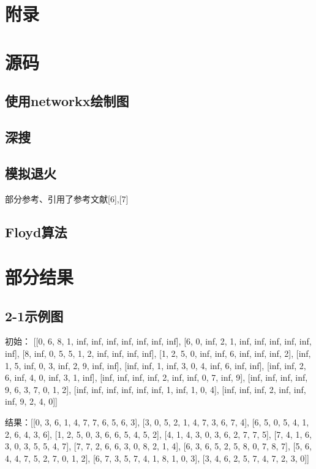 \documentclass[12pt]{article}
\begin{document}
\section*{附录}
\setcounter{footnote}{0}
\setcounter{section}{0}
\section{源码}
\subsection{使用networkx绘制图}

\subsection{深搜}

\subsection{模拟退火}
部分参考、引用了参考文献[6],[7]

\subsection{Floyd算法}

\section{部分结果}
\subsection{2-1示例图}
初始： [[0, 6, 8, 1, inf, inf, inf, inf, inf, inf, inf],
 [6, 0, inf, 2, 1, inf, inf, inf, inf, inf, inf],
 [8, inf, 0, 5, 5, 1, 2, inf, inf, inf, inf],
 [1, 2, 5, 0, inf, inf, 6, inf, inf, inf, 2],
 [inf, 1, 5, inf, 0, 3, inf, 2, 9, inf, inf],
 [inf, inf, 1, inf, 3, 0, 4, inf, 6, inf, inf],
 [inf, inf, 2, 6, inf, 4, 0, inf, 3, 1, inf],
 [inf, inf, inf, inf, 2, inf, inf, 0, 7, inf, 9],
 [inf, inf, inf, inf, 9, 6, 3, 7, 0, 1, 2],
 [inf, inf, inf, inf, inf, inf, 1, inf, 1, 0, 4],
 [inf, inf, inf, 2, inf, inf, inf, 9, 2, 4, 0]]
 
 
 结果：[[0, 3, 6, 1, 4, 7, 7, 6, 5, 6, 3],
 [3, 0, 5, 2, 1, 4, 7, 3, 6, 7, 4],
 [6, 5, 0, 5, 4, 1, 2, 6, 4, 3, 6],
 [1, 2, 5, 0, 3, 6, 6, 5, 4, 5, 2],
 [4, 1, 4, 3, 0, 3, 6, 2, 7, 7, 5],
 [7, 4, 1, 6, 3, 0, 3, 5, 5, 4, 7],
 [7, 7, 2, 6, 6, 3, 0, 8, 2, 1, 4],
 [6, 3, 6, 5, 2, 5, 8, 0, 7, 8, 7],
 [5, 6, 4, 4, 7, 5, 2, 7, 0, 1, 2],
 [6, 7, 3, 5, 7, 4, 1, 8, 1, 0, 3],
 [3, 4, 6, 2, 5, 7, 4, 7, 2, 3, 0]]
 
\end{document}
